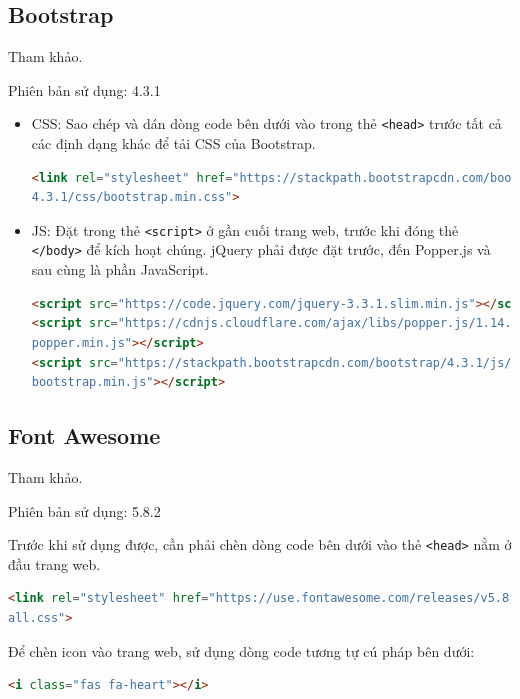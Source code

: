 \subsection{Bootstrap}
Tham khảo\cite{bootstrap}.
\par
Phiên bản sử dụng: 4.3.1
\begin{itemize}
 	\item CSS: Sao chép và dán dòng code bên dưới vào trong thẻ \texttt{<head>} trước tất cả các định dạng khác để tải CSS của Bootstrap.
 	\begin{lstlisting}[language=HTML]
<link rel="stylesheet" href="https://stackpath.bootstrapcdn.com/bootstrap/
4.3.1/css/bootstrap.min.css">
	\end{lstlisting}
	\item JS: Đặt trong thẻ \texttt{<script>} ở gần cuối trang web, trước khi đóng thẻ \texttt{</body>} để kích hoạt chúng. jQuery phải được đặt trước, đến Popper.js và sau cùng là phần JavaScript.
	\begin{lstlisting}[language=HTML]
<script src="https://code.jquery.com/jquery-3.3.1.slim.min.js"></script>
<script src="https://cdnjs.cloudflare.com/ajax/libs/popper.js/1.14.7/umd/
popper.min.js"></script>
<script src="https://stackpath.bootstrapcdn.com/bootstrap/4.3.1/js/
bootstrap.min.js"></script>
	\end{lstlisting}
\end{itemize}
\subsection{Font Awesome}
Tham khảo\cite{awesome}.
\par
Phiên bản sử dụng: 5.8.2
\par
Trước khi sử dụng được, cần phải chèn dòng code bên dưới vào thẻ \texttt{<head>} nằm ở đầu trang web.
\begin{lstlisting}[language=HTML]
<link rel="stylesheet" href="https://use.fontawesome.com/releases/v5.8.2/css/
all.css">
\end{lstlisting}
\par
Để chèn icon vào trang web, sử dụng dòng code tương tự cú pháp bên dưới:
\begin{lstlisting}[language=HTML]
<i class="fas fa-heart"></i>
\end{lstlisting}
